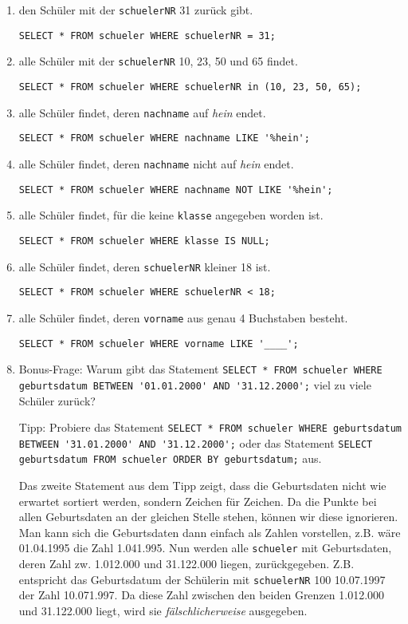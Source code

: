 \begin{Answer}[ref=Where]
	\begin{enumerate}
		\item den Schüler mit der \lstinline!schuelerNR! 31 zurück gibt.

		\lstinline!SELECT * FROM schueler WHERE schuelerNR = 31;!
		\item alle Schüler mit der \lstinline!schuelerNR! 10, 23, 50 und 65 findet.

		\lstinline!SELECT * FROM schueler WHERE schuelerNR in (10, 23, 50, 65);!
		\item alle Schüler findet, deren \lstinline!nachname! auf \textit{hein} endet.

		\lstinline!SELECT * FROM schueler WHERE nachname LIKE '%hein';!
		\item alle Schüler findet, deren \lstinline!nachname! nicht auf \textit{hein} endet.

		\lstinline!SELECT * FROM schueler WHERE nachname NOT LIKE '%hein';!
		\item alle Schüler findet, für die keine \lstinline!klasse! angegeben worden ist.

		\lstinline!SELECT * FROM schueler WHERE klasse IS NULL;!

		\item alle Schüler findet, deren \lstinline!schuelerNR! kleiner 18 ist.

		\lstinline!SELECT * FROM schueler WHERE schuelerNR < 18;!
		\item alle Schüler findet, deren \lstinline!vorname! aus genau 4 Buchstaben besteht.

		\lstinline!SELECT * FROM schueler WHERE vorname LIKE '____';!
		\item Bonus-Frage: Warum gibt das Statement \lstinline[breaklines=true]!SELECT * FROM schueler WHERE geburtsdatum BETWEEN '01.01.2000' AND '31.12.2000';! viel zu viele Schüler zurück?

		Tipp: Probiere das Statement \lstinline[breaklines=true]!SELECT * FROM schueler WHERE geburtsdatum BETWEEN '31.01.2000' AND '31.12.2000';! oder das Statement \lstinline!SELECT geburtsdatum FROM schueler ORDER BY geburtsdatum;! aus.

		Das zweite Statement aus dem Tipp zeigt, dass die Geburtsdaten nicht wie erwartet sortiert werden, sondern Zeichen für Zeichen. Da die Punkte bei allen Geburtsdaten an der gleichen Stelle stehen, können wir diese ignorieren. Man kann sich die Geburtsdaten dann einfach als Zahlen vorstellen, z.B. wäre 01.04.1995 die Zahl 1.041.995. Nun werden alle \lstinline!schueler! mit Geburtsdaten, deren Zahl zw. 1.012.000 und 31.122.000 liegen, zurückgegeben. Z.B. entspricht das Geburtsdatum der Schülerin mit \lstinline!schuelerNR! 100 10.07.1997 der Zahl 10.071.997. Da diese Zahl zwischen den beiden Grenzen 1.012.000 und 31.122.000 liegt, wird sie \textit{fälschlicherweise} ausgegeben.
	\end{enumerate}
\end{Answer}